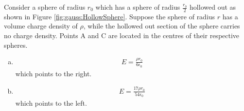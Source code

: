 \question Consider a sphere of radius $r_0$ which has a sphere of radius $\frac{r_0}{2}$ hollowed out as shown in Figure \ref{fig:gauss:HollowSphere}. Suppose the sphere of radius $r$ has a volume charge density of $\rho$, while the hollowed out section of the sphere carries no charge density. Points A and C are located in the centres of their respective spheres.
\begin{finalanswer}
	\begin{enumerate}[(a)]
		\item \begin{align*}
		E=\frac{\rho r_0}{6\epsilon_0}
		\end{align*} which points to the right.
		\item \begin{align*}
		E=\frac{17\rho r_0}{54\epsilon_0}
		\end{align*} 
		which points to the left.
	\end{enumerate}
\end{finalanswer}
